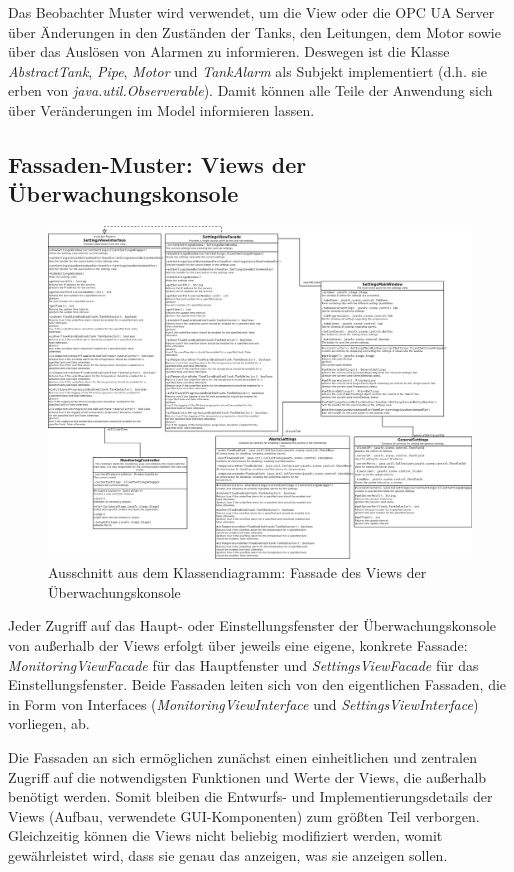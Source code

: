 \documentclass[parskip=full]{scrartcl}
\begin{document}
Das Beobachter Muster wird verwendet, um die View oder die OPC UA Server über Änderungen in den Zuständen der Tanks, den Leitungen, dem Motor sowie über
das Auslösen von Alarmen zu informieren. Deswegen ist die Klasse \emph{AbstractTank}, \emph{Pipe}, \emph{Motor} und \emph{TankAlarm} als Subjekt implementiert
(d.h. sie erben von \emph{java.util.Observerable}). Damit können alle Teile der Anwendung sich über Veränderungen im Model informieren lassen.

\pagebreak
\subsection{Fassaden-Muster: Views der Überwachungskonsole}
\begin{figure}[H]
  \centering
  \includegraphics[scale=0.22]{design/pattern-screenshots/fascade-SettingsView.png}
  \caption{Ausschnitt aus dem Klassendiagramm: Fassade des Views der Überwachungskonsole}
\end{figure}
Jeder Zugriff auf das Haupt- oder Einstellungsfenster der Überwachungskonsole von außerhalb der Views erfolgt über jeweils eine eigene, konkrete Fassade:
\emph{MonitoringViewFacade} für das Hauptfenster und \emph{SettingsViewFacade} für das Einstellungsfenster. Beide Fassaden leiten sich von den eigentlichen Fassaden, die in Form
von Interfaces (\emph{MonitoringViewInterface} und \emph{SettingsViewInterface}) vorliegen, ab.

Die Fassaden an sich ermöglichen zunächst einen einheitlichen und zentralen Zugriff auf die notwendigsten Funktionen und Werte der Views, die außerhalb benötigt werden. Somit
bleiben die Entwurfs- und Implementierungsdetails der Views (Aufbau, verwendete GUI-Komponenten) zum größten Teil verborgen. Gleichzeitig können die Views nicht beliebig
modifiziert werden, womit gewährleistet wird, dass sie genau das anzeigen, was sie anzeigen sollen.
\end{document}
